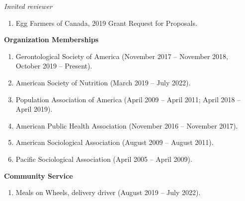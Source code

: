 \documentclass[
]{article}
\providecommand{\tightlist}{%
  \setlength{\itemsep}{0pt}\setlength{\parskip}{0pt}}
\begin{document}
\emph{Invited reviewer}

\begin{enumerate}
\def\labelenumi{\arabic{enumi}.}
\tightlist
\item
  Egg Farmers of Canada, 2019 Grant Request for Proposals.
\end{enumerate}

\textbf{Organization Memberships}

\begin{enumerate}
\def\labelenumi{\arabic{enumi}.}
\item
  Gerontological Society of America (November 2017 -- November 2018,
  October 2019 -- Present).
\item
  American Society of Nutrition (March 2019 -- July 2022).
\item
  Population Association of America (April 2009 -- April 2011; April
  2018 -- April 2019).
\item
  American Public Health Association (November 2016 -- November 2017).
\item
  American Sociological Association (August 2009 -- August 2011).
\item
  Pacific Sociological Association (April 2005 -- April 2009).
\end{enumerate}

\textbf{Community Service}

\begin{enumerate}
\def\labelenumi{\arabic{enumi}.}
\tightlist
\item
  Meals on Wheels, delivery driver (August 2019 -- July 2022).
\end{enumerate}
\end{document}
